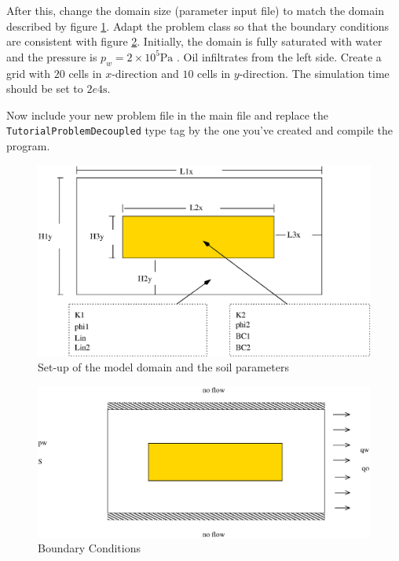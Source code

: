 After this, change the domain size (parameter input file) to match the domain described
by figure \ref{tutorial-decoupled:ex2_Domain}. Adapt the problem class
so that the boundary conditions are consistent with figure
\ref{tutorial-decoupled:ex2_BC}. Initially, the domain is fully saturated
with water and the pressure is $p_w = 2 \times 10^5 \text{Pa}$ . Oil
infiltrates from the left side. Create a grid with $20$ cells in
$x$-direction and $10$ cells in $y$-direction. The simulation time
should be set to $2e4 \text{s}$.

Now include your new problem file in the main file and replace the
\texttt{TutorialProblemDecoupled} type tag by the one you've created and
compile the program.


\begin{figure}[ht]
\centering
\includegraphics[width=0.8\linewidth,keepaspectratio]{EPS/Ex2_Domain.eps}
\caption{Set-up of the model domain and the soil parameters}\label{tutorial-decoupled:ex2_Domain}
\end{figure}

\begin{figure}[ht]
\centering
\includegraphics[width=0.8\linewidth,keepaspectratio]{EPS/Ex2_Boundary.eps}
\caption{Boundary Conditions}\label{tutorial-decoupled:ex2_BC}
\end{figure}

